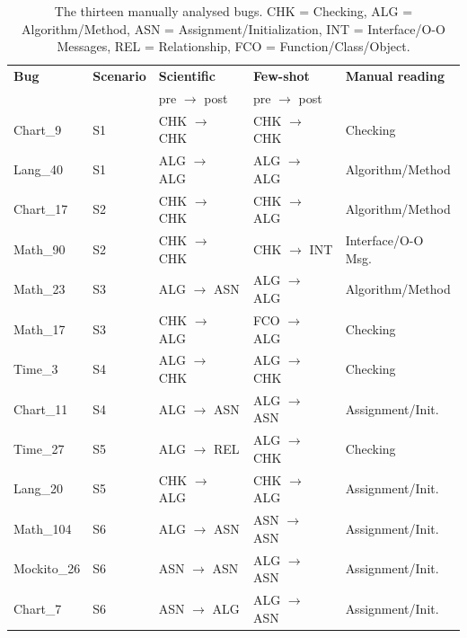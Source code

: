 \documentclass{iutbscthesis}
\begin{document}
\begin{table}[!htbp]
    \centering
    \begin{tabular}{l l l l l}
        \toprule
        \textbf{Bug} & \textbf{Scenario} & \textbf{Scientific} & \textbf{Few-shot} & \textbf{Manual reading} \\
        & & pre $\rightarrow$ post & pre $\rightarrow$ post & \\
        \midrule
        Chart\_9     & S1 & CHK $\rightarrow$ CHK & CHK $\rightarrow$ CHK & Checking \\
        Lang\_40     & S1 & ALG $\rightarrow$ ALG & ALG $\rightarrow$ ALG & Algorithm/Method \\
        \midrule
        Chart\_17    & S2 & CHK $\rightarrow$ CHK & CHK $\rightarrow$ ALG & Algorithm/Method \\
        Math\_90     & S2 & CHK $\rightarrow$ CHK & CHK $\rightarrow$ INT & Interface/O-O Msg. \\
        \midrule
        Math\_23     & S3 & ALG $\rightarrow$ ASN & ALG $\rightarrow$ ALG & Algorithm/Method \\
        Math\_17     & S3 & CHK $\rightarrow$ ALG & FCO $\rightarrow$ ALG & Checking \\
        \midrule
        Time\_3      & S4 & ALG $\rightarrow$ CHK & ALG $\rightarrow$ CHK & Checking \\
        Chart\_11    & S4 & ALG $\rightarrow$ ASN & ALG $\rightarrow$ ASN & Assignment/Init. \\
        \midrule
        Time\_27     & S5 & ALG $\rightarrow$ REL & ALG $\rightarrow$ CHK & Checking \\
        Lang\_20     & S5 & CHK $\rightarrow$ ALG & CHK $\rightarrow$ ALG & Assignment/Init. \\
        \midrule
        Math\_104    & S6 & ALG $\rightarrow$ ASN & ASN $\rightarrow$ ASN & Assignment/Init. \\
        Mockito\_26  & S6 & ASN $\rightarrow$ ASN & ALG $\rightarrow$ ASN & Assignment/Init. \\
        Chart\_7     & S6 & ASN $\rightarrow$ ALG & ALG $\rightarrow$ ASN & Assignment/Init. \\
        \bottomrule
    \end{tabular}
    \caption{The thirteen manually analysed bugs. CHK = Checking, ALG = Algorithm/Method, ASN = Assignment/\allowbreak Initialization, INT = Interface/\allowbreak O-O Messages, REL = Relationship, FCO = Function/\allowbreak Class/\allowbreak Object.}
    \label{tab:manual}
\end{table}
\end{document}
